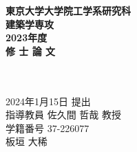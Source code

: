 \documentclass[11pt,a4j]{jreport}
\begin{document}
\thispagestyle{empty}

\begin{center}
  \vspace{20mm}
  {\Large\noindent\textbf{東京大学大学院工学系研究科}}\\
  \medskip
  {\Large\noindent\textbf{建築学専攻}}\\
  \vspace{30mm}
  {\Large\noindent\textbf{2023年度}}\\
  \medskip
  {\huge\noindent\textbf{修 士 論 文}}\\
  \vspace{30mm}
  {\huge{}}\\
  \medskip
  {\huge{}}\\
  \vspace{70mm}

  {\Large\noindent
  2024年1月15日 提出\\
  指導教員 佐久間 哲哉 教授    \\
  \vspace{\baselineskip}
  学籍番号 37-226077 \\
  \vspace{\baselineskip}
  板垣 大稀\\
  }
  \vspace{40mm}

\end{center}

\thispagestyle{empty}
\clearpage
\end{document}
